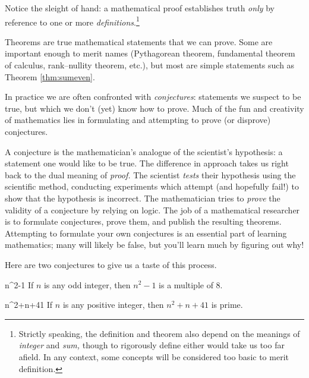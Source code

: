 Notice the sleight of hand: a mathematical proof establishes truth \emph{only} by reference to one or more \emph{definitions}.\footnote{Strictly speaking, the definition and theorem also depend on the meanings of \emph{integer} and \emph{sum,} though to rigorously define either would take us too far afield. In any context, some concepts will be considered too basic to merit definition.}


\goodbreak



Theorems are true mathematical statements that we can prove. Some are important enough to merit names (Pythagorean theorem, fundamental theorem of calculus, rank--nullity theorem, etc.), but most are simple statements such as Theorem \ref{thm:sumeven}.\smallbreak

In practice we are often confronted with \emph{conjectures}: statements we suspect to be true, but which we don't (yet) know how to prove. Much of the fun and creativity of mathematics lies in formulating and attempting to prove (or disprove) conjectures.\smallbreak

A conjecture is the mathematician's analogue of the scientist's hypothesis: a statement one would like to be true. The difference in approach takes us right back to the dual meaning of \emph{proof.} The scientist \emph{tests} their hypothesis using the scientific method, conducting experiments which attempt (and hopefully fail!) to show that the hypothesis is incorrect. The mathematician tries to \emph{prove} the validity of a conjecture by relying on logic. The job of a mathematical researcher is to formulate conjectures, prove them, and publish the resulting theorems. Attempting to formulate your own conjectures is an essential part of learning mathematics; many will likely be false, but you'll learn much by figuring out why!\medbreak

Here are two conjectures to give us a taste of this process.

\begin{conj}{}{n^2-1}
	If $n$ is any odd integer, then $n^2-1$ is a multiple of 8.
\end{conj}

\begin{conj}{}{n^2+n+41}
	If $n$ is any positive integer, then $n^2+n+41$ is prime.\footnotemark
\end{conj}


